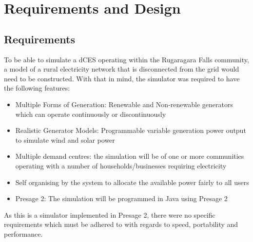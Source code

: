 \chapter{Requirements and Design}
\label{Requirements and Design}
\section*{Requirements}
To be able to simulate a dCES operating within the Rugaragara Falls community, a model of a rural electricity network that is disconnected from the grid would need to be constructed. With that in mind, the simulator was required to have the following features:
\begin{itemize}
  \item Multiple Forms of Generation: Renewable and Non-renewable generators which can operate continuously or discontinuously
  \item Realistic Generator Models: Programmable variable generation power output to simulate wind and solar power
  \item Multiple demand centres: the simulation will be of one or more communities operating with a number of households/businesses requiring electricity
  \item Self organising by the system to allocate the available power fairly to all users
  \item Presage 2: The simulation will be programmed in Java using Presage 2
\end{itemize}

As this is a simulator implemented in Presage 2, there were no specific requirements which must be adhered to with regards to speed, portability and performance.

